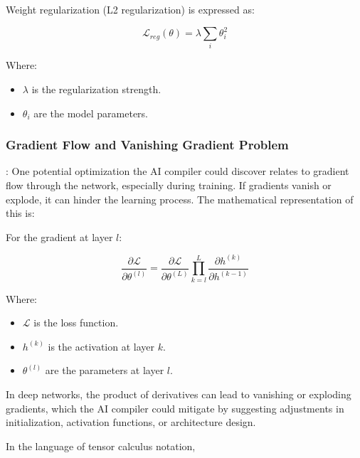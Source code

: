 \documentclass{article}
\begin{document}
Weight regularization (L2 regularization) is expressed as:

\[ \mathcal{L}_{\textit{reg}}(\theta) = \lambda \sum_{i} \theta_i^2 \]

Where:
\begin{itemize}
    \item \( \lambda \) is the regularization strength.
    \item \( \theta_i \) are the model parameters.
\end{itemize}

\subsubsection{Gradient Flow and Vanishing Gradient Problem}: One potential optimization the AI compiler could discover relates to gradient flow through the network, especially during training. If gradients vanish or explode, it can hinder the learning process. The mathematical representation of this is:

For the gradient at layer \( l \):

\[ \frac{\partial \mathcal{L}}{\partial \theta^{(l)}} = \frac{\partial \mathcal{L}}{\partial \theta^{(L)}} \prod_{k=l}^{L} \frac{\partial h^{(k)}}{\partial h^{(k-1)}} \]

Where:
\begin{itemize}
    \item \( \mathcal{L} \) is the loss function.
    \item \( h^{(k)} \) is the activation at layer \( k \).
    \item \( \theta^{(l)} \) are the parameters at layer \( l \).
\end{itemize}

In deep networks, the product of derivatives can lead to vanishing or exploding gradients, which the AI compiler could mitigate by suggesting adjustments in initialization, activation functions, or architecture design.

In the language of tensor calculus notation,
\end{document}
